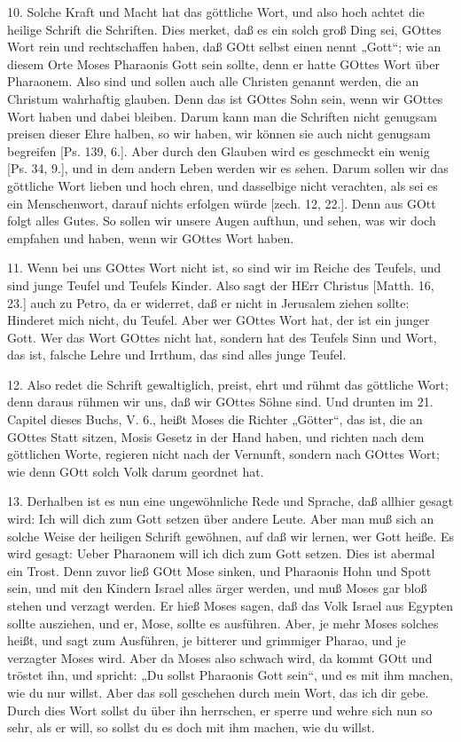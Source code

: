10. Solche Kraft und Macht hat das göttliche Wort, und also hoch achtet die heilige Schrift die Schriften. Dies merket, daß es ein solch groß Ding sei, GOttes Wort rein und rechtschaffen haben, daß GOtt selbst einen nennt „Gott“; wie an diesem Orte Moses Pharaonis Gott sein sollte, denn er hatte GOttes Wort über Pharaonem. Also sind und sollen auch alle Christen genannt werden, die an Christum wahrhaftig glauben. Denn das ist GOttes Sohn sein, wenn wir GOttes Wort haben und dabei bleiben. Darum kann man die Schriften nicht genugsam preisen dieser Ehre halben, so wir haben, wir können sie auch nicht genugsam begreifen [Ps. 139, 6.]. Aber durch den Glauben wird es geschmeckt ein wenig [Ps. 34, 9.], und in dem andern Leben werden wir es sehen. Darum sollen wir das göttliche Wort lieben und hoch ehren, und dasselbige nicht verachten, als sei es ein Menschenwort, darauf nichts erfolgen würde [zech. 12, 22.]. Denn aus GOtt folgt alles Gutes. So sollen wir unsere Augen aufthun, und sehen, was wir doch empfahen und haben, wenn wir GOttes Wort haben.

11. Wenn bei uns GOttes Wort nicht ist, so sind wir im Reiche des Teufels, und sind junge Teufel und Teufels Kinder. Also sagt der HErr Christus [Matth. 16, 23.] auch zu Petro, da er widerret, daß er nicht in Jerusalem ziehen sollte: Hinderet mich nicht, du Teufel. Aber wer GOttes Wort hat, der ist ein junger Gott. Wer das Wort GOttes nicht hat, sondern hat des Teufels Sinn und Wort, das ist, falsche Lehre und Irrthum, das sind alles junge Teufel.

12. Also redet die Schrift gewaltiglich, preist, ehrt und rühmt das göttliche Wort; denn daraus rühmen wir uns, daß wir GOttes Söhne sind. Und drunten im 21. Capitel dieses Buchs, V. 6., heißt Moses die Richter „Götter“, das ist, die an GOttes Statt sitzen, Mosis Gesetz in der Hand haben, und richten nach dem göttlichen Worte, regieren nicht nach der Vernunft, sondern nach GOttes Wort; wie denn GOtt solch Volk darum geordnet hat.

13. Derhalben ist es nun eine ungewöhnliche Rede und Sprache, daß allhier gesagt wird: Ich will dich zum Gott setzen über andere Leute. Aber man muß sich an solche Weise der heiligen Schrift gewöhnen, auf daß wir lernen, wer Gott heiße. Es wird gesagt: Ueber Pharaonem will ich dich zum Gott setzen. Dies ist abermal ein Trost. Denn zuvor ließ GOtt Mose sinken, und Pharaonis Hohn und Spott sein, und mit den Kindern Israel alles ärger werden, und muß Moses gar bloß stehen und verzagt werden. Er hieß Moses sagen, daß das Volk Israel aus Egypten sollte ausziehen, und er, Mose, sollte es ausführen. Aber, je mehr Moses solches heißt, und sagt zum Ausführen, je bitterer und grimmiger Pharao, und je verzagter Moses wird. Aber da Moses also schwach wird, da kommt GOtt und tröstet ihn, und spricht: „Du sollst Pharaonis Gott sein“, und es mit ihm machen, wie du nur willst. Aber das soll geschehen durch mein Wort, das ich dir gebe. Durch dies Wort sollst du über ihn herrschen, er sperre und wehre sich nun so sehr, als er will, so sollst du es doch mit ihm machen, wie du willst.

